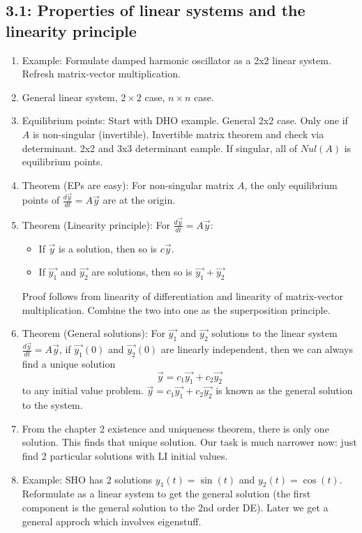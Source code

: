 \documentclass{article}
\begin{document}
\subsection{3.1: Properties of linear systems and the linearity principle}
\begin{enumerate}
\item Example: Formulate damped harmonic oscillator as a 2x2 linear system. Refresh matrix-vector multiplication.
\item General linear system, $2\times 2$ case, $n\times n$ case.
\item Equilibrium points: Start with DHO example. General 2x2 case. Only one if $A$ is non-singular (invertible). Invertible matrix theorem and check via determinant. 2x2 and 3x3 determinant eample. If singular, all of $Nul(A)$ is equilibrium points.
\item Theorem (EPs are easy): For non-singular matrix $A$, the only equilibrium points of $\frac{d \vec{y}}{dt} = A \vec{y}$ are at the origin.
\item Theorem (Linearity principle): For $\frac{d \vec{y}}{dt} = A \vec{y}$:
\begin{itemize}
\item If $\vec{y}$ is a solution, then so is $c \vec{y}$.
\item If $\vec{y_1}$ and $\vec{y_2}$ are solutions, then so is $\vec{y_1}+\vec{y_2}$
\end{itemize}
Proof follows from linearity of differentiation and linearity of matrix-vector multiplication. Combine the two into one as the superposition principle.
\item Theorem (General solutions): For $\vec{y_1}$ and $\vec{y_2}$ solutions to the linear system $\frac{d\vec{y}}{dt} = A\vec{y}$, if $\vec{y_1}(0)$ and $\vec{y_2}(0)$ are linearly independent, then we can always find a unique solution
\[
\vec{y} = c_1 \vec{y_1} + c_2 \vec{y_2}
\]
to any initial value problem. $\vec{y} = c_1 \vec{y_1} + c_2 \vec{y_2}$ is known as the general solution to the system.
\item From the chapter 2 existence and uniqueness theorem, there is only one solution. This finds that unique solution. Our task is much narrower now: just find 2 particular solutions with LI initial values.
\item Example: SHO has 2 solutions $y_1(t)=\sin(t)$ and $y_2(t)=\cos(t)$. Reformulate as a linear system to get the general solution (the first component is the general solution to the 2nd order DE). Later we get a general approch which involves eigenstuff.
\end{enumerate}
\end{document}

